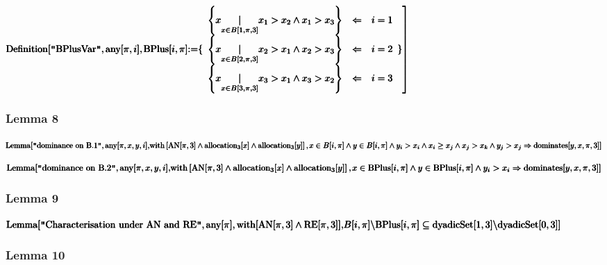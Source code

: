\documentclass{article}
\begin{document}
\noindent\(\pmb{\text{Definition}[\text{$\texttt{"}$BPlusVar$\texttt{"}$},\text{any}[\pi ,i],}\\
\pmb{\left.\text{BPlus}[i,\pi ]\text{:=}\{
\begin{array}{ccc}
 \left\{x\underset{x\in B[1,\pi ,3]}{|}x_1>x_2\land  x_1>x_3\right\} & \Leftarrow  & i=1 \\
 \left\{x\underset{x\in B[2,\pi ,3]}{|}x_2>x_1\land  x_2>x_3\right\} & \Leftarrow  & i=2 \\
 \left\{x\underset{x\in B[3,\pi ,3]}{|}x_3>x_1\land  x_3>x_2\right\} & \Leftarrow  & i=3
\end{array}
\} \right]}\)

\subsubsection*{Lemma 8}

\noindent\(\pmb{\text{Lemma}[\text{$\texttt{"}$dominance on B.1$\texttt{"}$},\text{any}[\pi ,x,y,i], }\\
\pmb{\text{with}\left[\text{AN}[\pi ,3]\land \text{allocation}_3[x]\land \text{allocation}_3[y]\right],}\\
\pmb{\left.x\in B[i,\pi ] \land y\in B[i,\pi ] \land y_i>x_i\land x_i\geq x_j\land x_j>x_k\land y_j>x_j\Rightarrow  \text{dominates}[y,x,\pi ,3]\right]}\)

\noindent\(\pmb{\text{Lemma}[\text{$\texttt{"}$dominance on B.2$\texttt{"}$},\text{any}[\pi ,x,y,i], }\\
\pmb{\text{with}\left[\text{AN}[\pi ,3]\land \text{allocation}_3[x]\land \text{allocation}_3[y]\right],}\\
\pmb{\left.x\in \text{BPlus}[i,\pi ] \land y\in \text{BPlus}[i,\pi ] \land y_i>x_i\Rightarrow  \text{dominates}[y,x,\pi ,3]\right]}\)

\subsubsection*{Lemma 9}

\noindent\(\pmb{\text{Lemma}[\text{$\texttt{"}$Characterisation under AN and RE$\texttt{"}$},\text{any}[\pi ],\text{with}[\text{AN}[\pi ,3]\land
\text{RE}[\pi ,3]],}\\
\pmb{ B[i,\pi ]\backslash \text{BPlus}[i,\pi ]\subseteq  \text{dyadicSet}[1,3]\backslash  \text{dyadicSet}[0,3]]}\)

\subsubsection*{Lemma 10}
\end{document}
